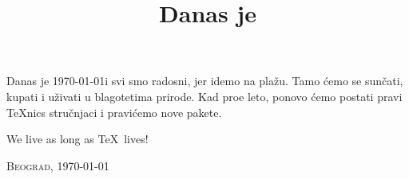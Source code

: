 \documentclass[a4paper,12pt]{article}
\title{Danas je}
\author{}
\begin{document}
\maketitle

Danas je \today i svi smo radosni, jer idemo na pla\v{z}u. Tamo \'{c}emo se sun\v{c}ati,
kupati i u\v{z}ivati u blagotetima prirode. Kad pro{\dj}e leto, ponovo \'{c}emo 
postati pravi \TeX nics stru\v{c}njaci i pravi\'{c}emo nove pakete. 

\begin{center}
We live as long as \TeX\ lives! 
\end{center}

\begin{flushleft}
\textsc{Beograd}, \today
\end{flushleft} 
\end{document}
